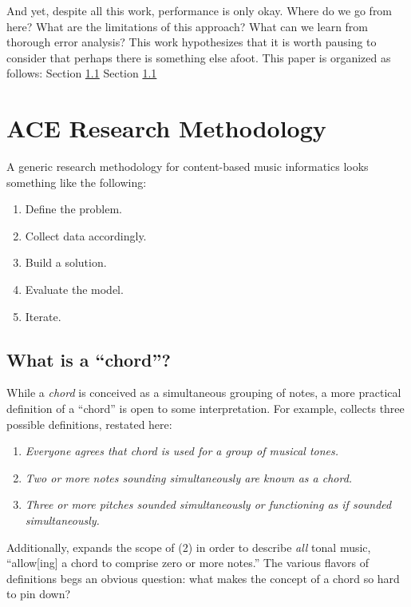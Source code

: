 \documentclass{article}
\begin{document}
And yet, despite all this work, performance is only okay.
Where do we go from here?
What are the limitations of this approach?
What can we learn from thorough error analysis?
This work hypothesizes that it is worth pausing to consider that perhaps there is something else afoot.
This paper is organized as follows:
Section \ref{}
Section \ref{}


\section{ACE Research Methodology}

A generic research methodology for content-based music informatics looks something like the following:

\begin{enumerate}
\item Define the problem.
\item Collect data accordingly.
\item Build a solution.
\item Evaluate the model.
\item Iterate.
\end{enumerate}


\subsection{What is a ``chord''?}

While a \emph{chord} is conceived as a simultaneous grouping of notes, a more practical definition of a ``chord'' is open to some interpretation.
For example, \cite{McVicar2013Machine} collects three possible definitions, restated here:

\begin{enumerate}
\item \emph{Everyone agrees that \emph{chord} is used for a group of musical tones.}
\item \emph{Two or more notes sounding simultaneously are known as a chord.}
\item \emph{Three or more pitches sounded simultaneously or functioning as if sounded simultaneously.}
\end{enumerate}

Additionally, \cite{Harte2010Towards} expands the scope of (2) in order to describe \emph{all} tonal music, ``allow[ing] a chord to comprise zero or more notes.''
The various flavors of definitions begs an obvious question:
what makes the concept of a chord so hard to pin down?
\end{document}
